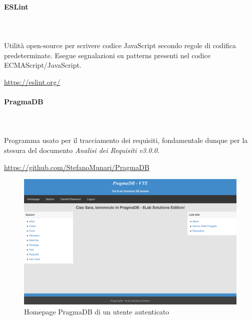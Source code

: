 		\paragraph{ESLint} \mbox{}\\ \mbox{}\\
		Utilità open-source per scrivere codice JavaScript secondo regole di codifica 
		predeterminate. Esegue segnalazioni su patterns presenti nel codice 
		ECMAScript/JavaScript.\\
		\centerline{\url{https://eslint.org/}}
				
		\paragraph{PragmaDB} \mbox{}\\ \mbox{}\\
		Programma usato per il tracciamento dei requisiti, fondamentale dunque 
		per la stesura del documento \textit{Analisi dei Requisiti v3.0.0}. 
		\newline
		\centerline{\url{https://github.com/StefanoMunari/PragmaDB}}
			\begin{figure}[H]
				\includegraphics[width=0.99\linewidth]{res/images/HomepagePragmaDB.png}
				\caption{Homepage PragmaDB di un utente autenticato}
			\end{figure}


